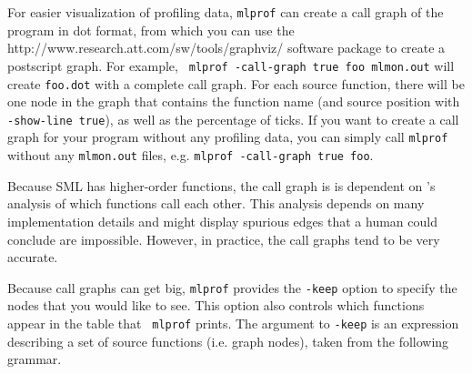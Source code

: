 For easier visualization of profiling data, {\tt mlprof} can create a
call graph of the program in dot format, from which you can use the
		  {http://www.research.att.com/sw/tools/graphviz/}
software package to create a postscript graph.  For example, {\tt
mlprof -call-graph true foo mlmon.out} will create {\tt foo.dot} with
a complete call graph.  For each source function, there will be one
node in the graph that contains the function name (and source position
with {\tt -show-line true}), as well as the percentage of ticks.  If
you want to create a call graph for your program without any profiling
data, you can simply call {\tt mlprof} without any {\tt mlmon.out}
files, e.g. {\tt mlprof -call-graph true foo}.

Because SML has higher-order functions, the call graph is is dependent
on {\mlton}'s analysis of which functions call each other.  This
analysis depends on many implementation details and might display
spurious edges that a human could conclude are impossible.  However,
in practice, the call graphs tend to be very accurate.

Because call graphs can get big, {\tt mlprof} provides the {\tt -keep}
option to specify the nodes that you would like to see.  This
option also controls which functions appear in the table that {\tt
mlprof} prints.  The argument to {\tt -keep} is an expression
describing a set of source functions (i.e. graph nodes), taken from
the following grammar.

